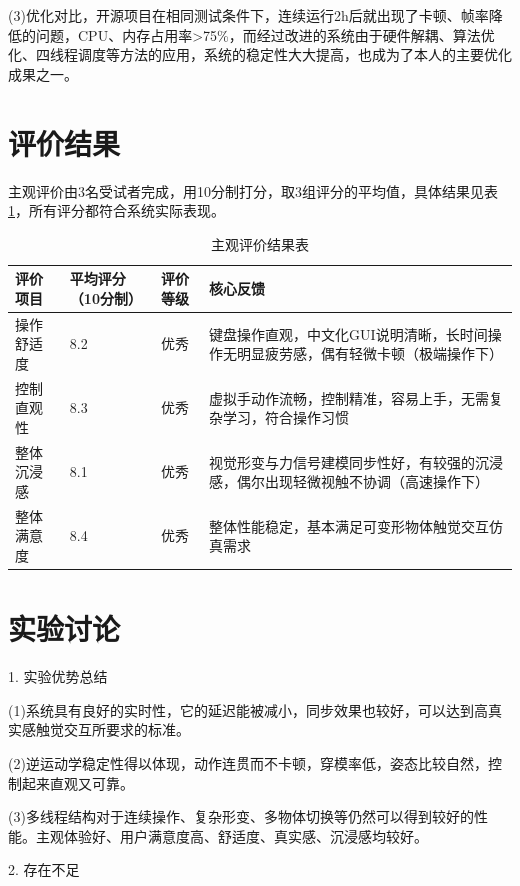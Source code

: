 (3)优化对比，开源项目在相同测试条件下，连续运行2h后就出现了卡顿、帧率降低的问题，CPU、内存占用率\textgreater75\%，而经过改进的系统由于硬件解耦、算法优化、四线程调度等方法的应用，系统的稳定性大大提高，也成为了本人的主要优化成果之一。



\section{评价结果}

主观评价由3名受试者完成，用10分制打分，取3组评分的平均值，具体结果见表\ref{tab:5-6}，所有评分都符合系统实际表现。

\begin{table}[H]
\centering
\caption{主观评价结果表}
\label{tab:5-6}
\scriptsize
\renewcommand{\arraystretch}{1.18}
\begin{tabularx}{\textwidth}{p{}p{}p{}X}
\toprule
评价项目 & 平均评分（10分制） & 评价等级 & 核心反馈 \\
\midrule
操作舒适度 & 8.2 & 优秀 & 键盘操作直观，中文化GUI说明清晰，长时间操作无明显疲劳感，偶有轻微卡顿（极端操作下） \\
控制直观性 & 8.3 & 优秀 & 虚拟手动作流畅，控制精准，容易上手，无需复杂学习，符合操作习惯 \\
整体沉浸感 & 8.1 & 优秀 & 视觉形变与力信号建模同步性好，有较强的沉浸感，偶尔出现轻微视触不协调（高速操作下） \\
整体满意度 & 8.4 & 优秀 & 整体性能稳定，基本满足可变形物体触觉交互仿真需求 \\
\bottomrule
\end{tabularx}
\end{table}



\section{实验讨论}

1. 实验优势总结

(1)系统具有良好的实时性，它的延迟能被减小，同步效果也较好，可以达到高真实感触觉交互所要求的标准。

(2)逆运动学稳定性得以体现，动作连贯而不卡顿，穿模率低，姿态比较自然，控制起来直观又可靠。

(3)多线程结构对于连续操作、复杂形变、多物体切换等仍然可以得到较好的性能。主观体验好、用户满意度高、舒适度、真实感、沉浸感均较好。

2. 存在不足

